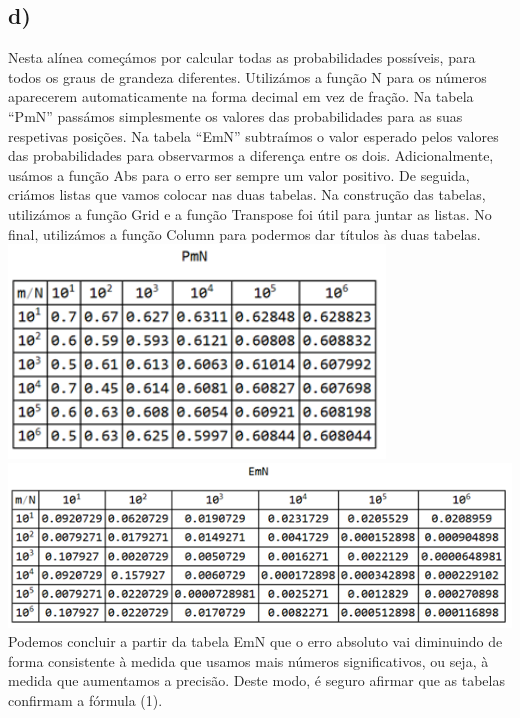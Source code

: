 \documentclass[12pt,a4paper]{article}
\begin{document}
    \subsection{d)}
        Nesta alínea começámos por calcular todas as probabilidades possíveis, para todos os graus de grandeza diferentes. Utilizámos a função N para os números aparecerem automaticamente na forma decimal em vez de fração. Na tabela “PmN” passámos simplesmente os valores das probabilidades para as suas respetivas posições. Na tabela “EmN” subtraímos o valor esperado pelos valores das probabilidades para observarmos a diferença entre os dois. Adicionalmente, usámos a função Abs para o erro ser sempre um valor positivo. De seguida, criámos listas que vamos colocar nas duas tabelas. Na construção das tabelas, utilizámos a função Grid e a função Transpose foi útil para juntar as listas. No final, utilizámos a função Column para podermos dar títulos às duas tabelas. \\

        \includegraphics[width=10cm]{2_1.png} \\
        \includegraphics[width=15cm]{2_2.png} \\

        Podemos concluir a partir da tabela EmN que o erro absoluto vai diminuindo de forma consistente à medida que usamos mais números significativos, ou seja, à medida que aumentamos a precisão. Deste modo, é seguro afirmar que as tabelas confirmam a fórmula (1).
\end{document}
